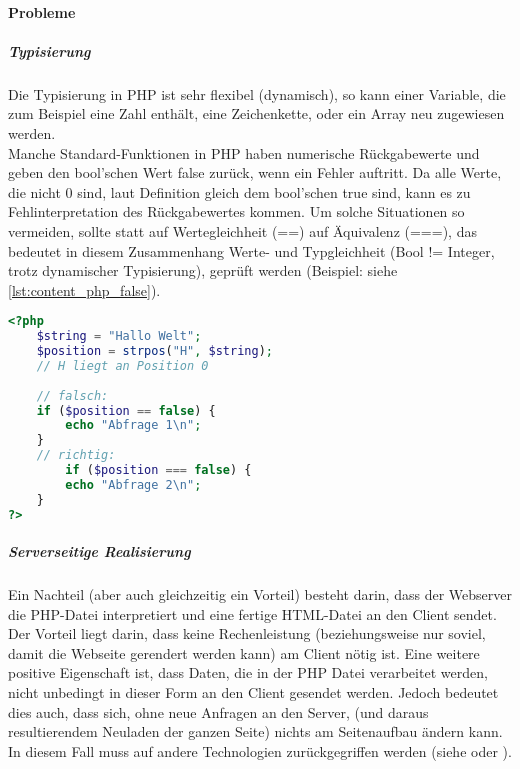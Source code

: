 \paragraph{Probleme\\}
\subparagraph{Typisierung\\} 
Die Typisierung in PHP ist sehr flexibel (dynamisch), so kann einer Variable, die zum Beispiel eine Zahl enthält, 
eine Zeichenkette, oder ein Array neu zugewiesen werden. \\
Manche Standard-Funktionen in PHP haben numerische Rückgabewerte und geben den bool'schen Wert false zurück, 
wenn ein Fehler auftritt. Da alle Werte, die nicht 0 sind, laut Definition gleich dem bool'schen true sind, 
kann es zu Fehlinterpretation des Rückgabewertes kommen. Um solche Situationen so vermeiden, sollte statt auf Wertegleichheit (==) auf Äquivalenz (===), das bedeutet in diesem Zusammenhang Werte- und Typgleichheit (Bool != Integer, trotz dynamischer Typisierung), geprüft werden (Beispiel: siehe \autoref{lst:content_php_false}).
\newpage
\begin{lstlisting}[style=custom, language=PHP,  caption={Typisierungsproblem},label={lst:content_php_false}]
<?php 
	$string = "Hallo Welt";
	$position = strpos("H", $string); 
	// H liegt an Position 0
	
	// falsch:
	if ($position == false) {
		echo "Abfrage 1\n";
	}
	// richtig:
		if ($position === false) {
		echo "Abfrage 2\n";
	}
?>
\end{lstlisting}
\subparagraph{Serverseitige Realisierung\\}
Ein Nachteil (aber auch gleichzeitig ein Vorteil) besteht darin, dass der Webserver die PHP-Datei interpretiert und eine fertige HTML-Datei an den Client sendet. Der Vorteil liegt darin, dass keine Rechenleistung (beziehungsweise nur soviel, damit die Webseite gerendert werden kann) am Client nötig ist. Eine weitere positive Eigenschaft ist, dass Daten, die in der PHP Datei verarbeitet werden, nicht unbedingt in dieser Form an den Client gesendet werden. 
Jedoch bedeutet dies auch, dass sich, ohne neue Anfragen an den Server, (und daraus resultierendem Neuladen der ganzen Seite) nichts am Seitenaufbau ändern kann.
In diesem Fall muss auf andere Technologien zurückgegriffen werden (siehe  oder ).


